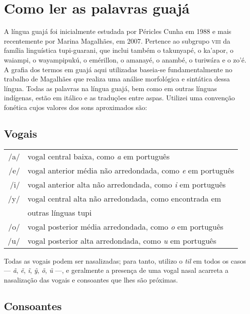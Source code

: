 \chapter{Como ler as palavras guajá}


A língua guajá foi inicialmente estudada por Péricles Cunha em 1988 e
mais recentemente por Marina Magalhães, em 2007. Pertence ao
subgrupo \textsc{viii} da família linguística tupi-guarani, que inclui também o
takunyapé, o ka'apor, o waiampi, o wayampipukú, o emérillon, o amanayé,
o anambé, o turiwára e o zo'é. %
A grafia dos termos em guajá aqui utilizadas baseia-se fundamentalmente no
trabalho de Magalhães que realiza uma análise morfológica e
sintática dessa língua. Todas as palavras na língua guajá, bem como em
outras línguas indígenas, estão em itálico e as traduções entre aspas.
Utilizei uma convenção fonética cujos valores dos sons aproximados são:

\section{Vogais}

\begin{tabular}{rl}
/a/ & vogal central baixa, como \textit{a} em português\\
/e/ & vogal anterior média não arredondada, como \textit{e} em português\\
/i/ & vogal anterior alta não arredondada, como \textit{i} em português\\
/y/ & vogal central alta não arredondada, como encontrada em\\
\mbox{}    & outras línguas tupi\\
/o/ & vogal posterior média arredondada, como \textit{o} em português\\
/u/ & vogal posterior alta arredondada, como \textit{u} em português
\end{tabular} 

\bigskip
\medskip

Todas as vogais podem ser nasalizadas; para tanto, utilizo o \textit{til} em
todos os casos --- \textit{ã}, \textit{ẽ}, \textit{ĩ}, \textit{ỹ}, \textit{õ}, \textit{ũ} ---, e geralmente a presença de uma
vogal nasal acarreta a nasalização das vogais e consoantes que lhes são
próximas.

\section{Consoantes}

